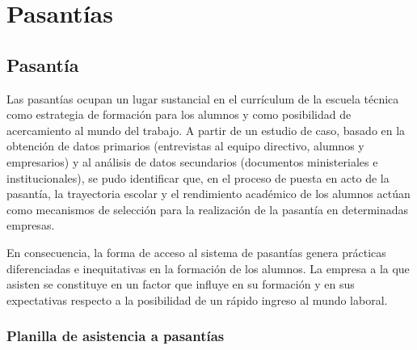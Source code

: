 \documentclass[../main]{subfiles}
\newcounter{z}
\begin{document}
\chapter{Pasantías}


\section{Pasantía}
Las pasantías ocupan un lugar sustancial en el currículum de la escuela técnica como estrategia de formación para los alumnos y como posibilidad de acercamiento al mundo del trabajo. 
A partir de un estudio de caso, basado en la obtención de datos primarios (entrevistas al equipo directivo, alumnos y empresarios) y al análisis de datos secundarios (documentos ministeriales e institucionales), se pudo identificar que, en el proceso de puesta en acto de la pasantía, la trayectoria escolar y el rendimiento académico de los alumnos actúan como mecanismos de selección para la realización de la pasantía en determinadas empresas. 

En consecuencia, la forma de acceso al sistema de pasantías genera prácticas diferenciadas e inequitativas en la formación de los alumnos. La empresa a la que asisten se constituye en un factor que influye en su formación y en sus expectativas respecto a la posibilidad de un rápido ingreso al mundo laboral.




\newpage

\subsection{Planilla de asistencia a pasantías}
\end{document}
